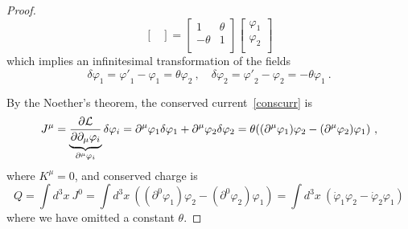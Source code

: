 \begin{proof}
\begin{equation*}
\begin{bmatrix}
            \end{bmatrix} = \begin{bmatrix}
                1 & \theta \\ - \theta & 1 \\
            \end{bmatrix} \begin{bmatrix}
                \varphi_1 \\ \varphi_2 \\
            \end{bmatrix} 
        \end{equation*} 
        which implies an infinitesimal transformation of the fields
        \begin{equation*}
            \delta \varphi_1 = {\varphi'}_1 - \varphi_1 = \theta \varphi_2 ~, \quad \delta \varphi_2 = {\varphi'}_2 - \varphi_2 = - \theta \varphi_1 ~.
        \end{equation*}

        By the Noether's theorem, the conserved current~\eqref{conscurr} is 
        \begin{equation*}
            J^\mu = \underbrace{\frac{\partial\mathcal L}{\partial\partial_\mu \varphi_i}}_{\partial^\mu \varphi_i} \delta \varphi_i = \partial^\mu \varphi_1 \delta \varphi_1 + \partial^\mu \varphi_2 \delta \varphi_2 = \theta ((\partial^\mu \varphi_1) \varphi_2 - (\partial^\mu \varphi_2) \varphi_1) ~,
        \end{equation*}
        where $K^\mu = 0$, and conserved charge is 
        \begin{equation*}
            Q = \int d^3 x ~ J^0 = \int d^3 x ~ ((\partial^0 \varphi_1) \varphi_2 - (\partial^0 \varphi_2) \varphi_1) = \int d^3 x ~ (\dot \varphi_1 \varphi_2 - \dot \varphi_2 \varphi_1)
        \end{equation*}
        where we have omitted a constant $\theta$. 


\end{proof}
